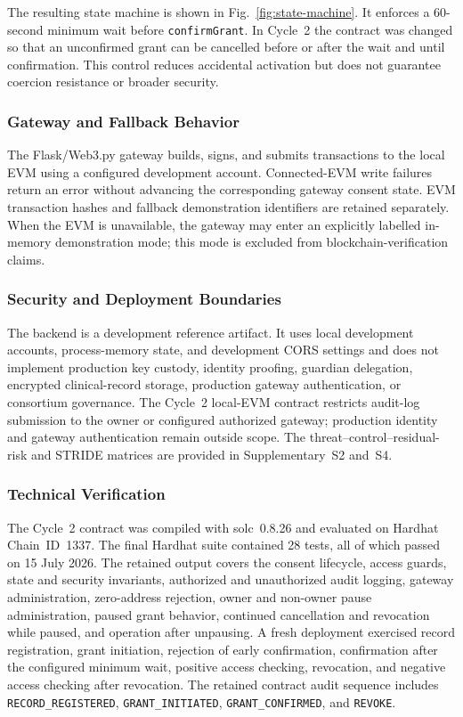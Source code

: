 \documentclass[journal]{IEEEtran}
\begin{document}
The resulting state machine is shown in Fig.~\ref{fig:state-machine}. It enforces a 60-second minimum wait before \texttt{confirmGrant}. In Cycle~2 the contract was changed so that an unconfirmed grant can be cancelled before or after the wait and until confirmation. This control reduces accidental activation but does not guarantee coercion resistance or broader security.

\subsubsection{Gateway and Fallback Behavior}

The Flask/Web3.py gateway builds, signs, and submits transactions to the local EVM using a configured development account. Connected-EVM write failures return an error without advancing the corresponding gateway consent state. EVM transaction hashes and fallback demonstration identifiers are retained separately. When the EVM is unavailable, the gateway may enter an explicitly labelled in-memory demonstration mode; this mode is excluded from blockchain-verification claims.

\subsubsection{Security and Deployment Boundaries}

The backend is a development reference artifact. It uses local development accounts, process-memory state, and development CORS settings and does not implement production key custody, identity proofing, guardian delegation, encrypted clinical-record storage, production gateway authentication, or consortium governance. The Cycle~2 local-EVM contract restricts audit-log submission to the owner or configured authorized gateway; production identity and gateway authentication remain outside scope. The threat--control--residual-risk and STRIDE matrices are provided in Supplementary~S2 and~S4.

\subsubsection{Technical Verification}

The Cycle~2 contract was compiled with solc~0.8.26 and evaluated on Hardhat Chain~ID~1337. The final Hardhat suite contained 28 tests, all of which passed on 15 July 2026. The retained output covers the consent lifecycle, access guards, state and security invariants, authorized and unauthorized audit logging, gateway administration, zero-address rejection, owner and non-owner pause administration, paused grant behavior, continued cancellation and revocation while paused, and operation after unpausing. A fresh deployment exercised record registration, grant initiation, rejection of early confirmation, confirmation after the configured minimum wait, positive access checking, revocation, and negative access checking after revocation. The retained contract audit sequence includes \texttt{RECORD\_REGISTERED}, \texttt{GRANT\_INITIATED}, \texttt{GRANT\_CONFIRMED}, and \texttt{REVOKE}.
\end{document}
